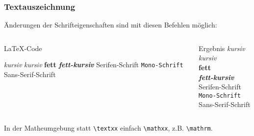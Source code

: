 \begin{frame}[fragile]
    \frametitle{Textauszeichnung}
    Änderungen der Schrifteigenschaften sind mit diesen Befehlen möglich:
    \begin{columns}[t]
        \begin{column}{0.6\textwidth}
            \begin{block}{\LaTeX-Code}
                \begin{lstverbatim}
                \textit{kursiv} \emph{kursiv}
                \textbf{fett}
                \textbf{\textit{fett-kursiv}}
                \textrm{Serifen-Schrift}
                \texttt{Mono-Schrift}
                \textsf{Sans-Serif-Schrift}
                \end{lstverbatim}
            \end{block}
        \end{column}
        \begin{column}{0.35\textwidth}
            \begin{block}{Ergebnis}
                \textit{kursiv} \emph{kursiv} \\
                \textbf{fett} \\
                \textbf{\textit{fett-kursiv}} \\
                \textrm{Serifen-Schrift} \\
                \texttt{Mono-Schrift} \\
                \textsf{Sans-Serif-Schrift}
            \end{block}
        \end{column}
    \end{columns}
    \vspace{1em}
In der Matheumgebung statt \verb+\textxx+ einfach \verb+\mathxx+, z.B.  \verb+\mathrm+.
\end{frame}

